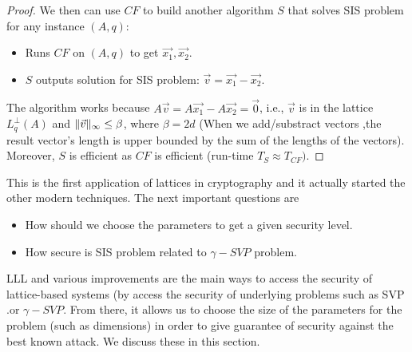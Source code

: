 \begin{description}
\begin{proof}
            We then can use $CF$ to build another algorithm $S$ that solves SIS
            problem for any instance $(A,q)$:
            \begin{itemize}
                \item Runs $CF$ on $(A,q)$ to get $\vec{x_1},\vec{x_2}$.
                \item $S$ outputs solution for SIS problem: $\vec{v} =
                    \vec{x_1} - \vec{x_2}$.
            \end{itemize}

            The algorithm works because $A\vec{v} = A\vec{x_1} - A\vec{x_2} =
            \vec{0}$, i.e., $\vec{v}$ is in the lattice $L_q^\bot(A)$ and
            $\Vert \vec{v} \Vert_{\infty} \leq \beta$, where $\beta =
            2d$ (When we add/substract vectors
                ,the result vector's length is upper bounded by the sum of
            the lengths of the vectors). Moreover, $S$ is efficient as $CF$ is
            efficient
            (run-time $T_S \approx T_{CF})$.
        \end{proof}
        This is the first application of lattices in cryptography and it
        actually started the other modern techniques. The next important
        questions are
        \begin{itemize}
            \item How should we choose the parameters to get a given security
                level.
            \item How secure is SIS problem related to $\gamma-SVP$ problem.
        \end{itemize}

\end{description}

LLL and various improvements are the main ways to access the security of
lattice-based systems (by access the security of underlying problems such as SVP
    .or $\gamma-SVP$. From there, it allows us to choose the size of the
    parameters for the problem (such as dimensions) in order to give guarantee
    of security against the best known attack. We discuss these in this
    section.

